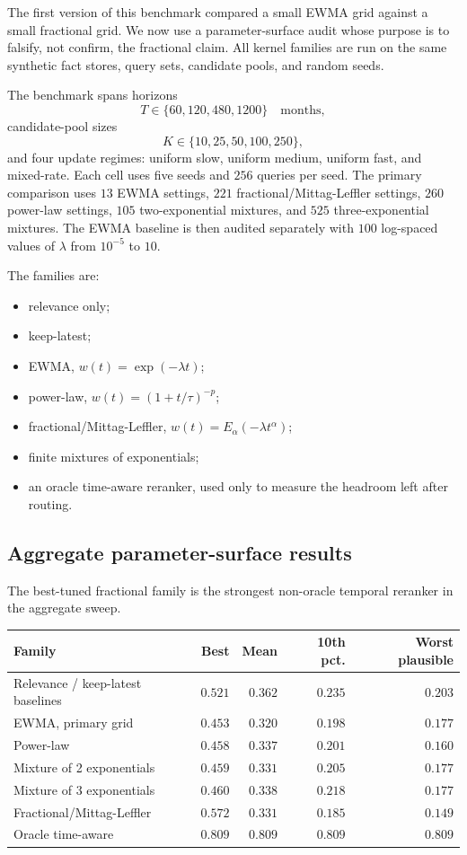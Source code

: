 \documentclass[11pt]{article}
\theoremstyle{plain}
\theoremstyle{definition}
\begin{document}
The first version of this benchmark compared a small
EWMA grid against a small fractional grid.  We now use a
parameter-surface audit whose purpose is to falsify, not
confirm, the fractional claim.  All kernel families are
run on the same synthetic fact stores, query sets,
candidate pools, and random seeds.

The benchmark spans horizons
\[
T\in\{60,120,480,1200\}\quad\text{months},
\]
candidate-pool sizes
\[
K\in\{10,25,50,100,250\},
\]
and four update regimes: uniform slow, uniform medium,
uniform fast, and mixed-rate.  Each cell uses five seeds
and $256$ queries per seed.  The primary comparison uses
$13$ EWMA settings, $221$ fractional/Mittag-Leffler
settings, $260$ power-law settings, $105$ two-exponential
mixtures, and $525$ three-exponential mixtures.  The EWMA
baseline is then audited separately with $100$ log-spaced
values of $\lambda$ from $10^{-5}$ to $10$.

The families are:
\begin{itemize}[leftmargin=*]
\item relevance only;
\item keep-latest;
\item EWMA, $w(t)=\exp(-\lambda t)$;
\item power-law, $w(t)=(1+t/\tau)^{-p}$;
\item fractional/Mittag-Leffler,
  $w(t)=E_\alpha(-\lambda t^\alpha)$;
\item finite mixtures of exponentials;
\item an oracle time-aware reranker, used only to measure
  the headroom left after routing.
\end{itemize}

\subsection{Aggregate parameter-surface results}

The best-tuned fractional family is the strongest
non-oracle temporal reranker in the aggregate sweep.

\begin{center}
\begin{tabular}{@{}lrrrr@{}}
\toprule
Family & Best & Mean & 10th pct. & Worst plausible \\
\midrule
Relevance / keep-latest baselines & $0.521$ & $0.362$ & $0.235$ & $0.203$ \\
EWMA, primary grid & $0.453$ & $0.320$ & $0.198$ & $0.177$ \\
Power-law & $0.458$ & $0.337$ & $0.201$ & $0.160$ \\
Mixture of 2 exponentials & $0.459$ & $0.331$ & $0.205$ & $0.177$ \\
Mixture of 3 exponentials & $0.460$ & $0.338$ & $0.218$ & $0.177$ \\
Fractional/Mittag-Leffler & $\mathbf{0.572}$ & $0.331$ & $0.185$ & $0.149$ \\
Oracle time-aware & $0.809$ & $0.809$ & $0.809$ & $0.809$ \\
\bottomrule
\end{tabular}
\end{center}
\end{document}
